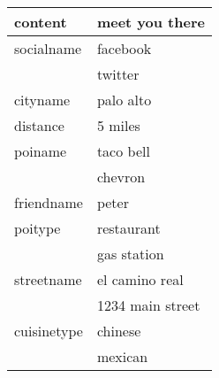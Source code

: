 \begin{tabular}{l|l}
content&meet you there\\\hline
socialname&facebook\\
&twitter\\\hline
cityname&palo alto\\\hline
distance&5 miles\\\hline
poiname&taco bell\\
&chevron\\\hline
friendname&peter\\\hline
poitype&restaurant\\
&gas station\\\hline
streetname&el camino real\\
&1234 main street\\\hline
cuisinetype&chinese\\
&mexican\\
\end{tabular}